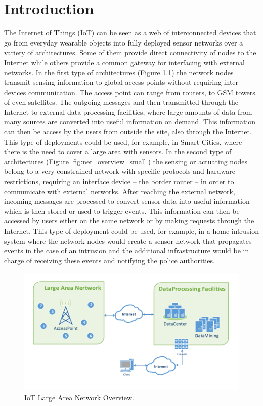 
\chapter{Introduction}
\label{chapter:introduction}

The Internet of Things (\gls{IoT}) can be seen as a web of interconnected devices that go from everyday wearable objects into fully deployed sensor networks over a variety of architectures. Some of them provide direct connectivity of nodes to the Internet while others provide a common gateway for interfacing with external networks. In the first type of architectures (Figure \ref{fig:net_overview_large}) the network nodes transmit sensing information to global access points without requiring inter-devices communication. The access point can range from routers, to GSM towers of even satellites. The outgoing messages and then transmitted through the Internet to external data processing facilities, where large amounts of data from many sources are converted into useful information on demand. This information can then be access by the users from outside the site, also through the Internet. This type of deployments could be used, for example, in Smart Cities, where there is the need to cover a large area with sensors. In the second type of architectures (Figure  \ref{fig:net_overview_small}) the sensing or actuating nodes belong to a very constrained network with specific protocols and hardware restrictions, requiring an interface device -- the border router -- in order to communicate with external networks. After reaching the external network, incoming messages are processed to convert sensor data into useful information which is then stored or used to trigger events. This information can then be accessed by users either on the same network or by making requests through the Internet. This type of deployment could be used, for example, in a home intrusion system where the network nodes would create a sensor network that propagates events in the case of an intrusion and the additional infrastructure would be in charge of receiving these events and notifying the police authorities.
\begin{figure}
  \centering
  \includegraphics[width=0.85\linewidth]{figures/Network_Overview_Sparse.pdf}
  \caption{IoT Large Area Network Overview.}
  \label{fig:net_overview_large}
\end{figure}

